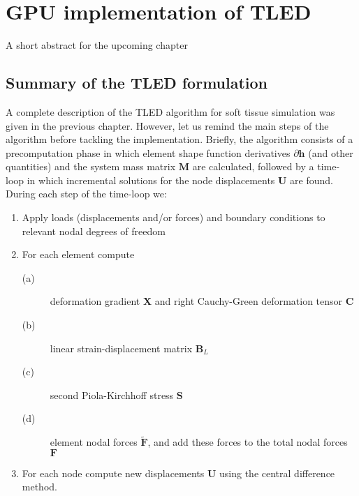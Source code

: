 \chapter{GPU implementation of TLED}
\label{chap6}
\begin{shortAbstract}
A short abstract for the upcoming chapter
\end{shortAbstract}

\section{Summary of the TLED formulation}
A complete description of the TLED algorithm for soft tissue simulation was given in the previous chapter. However, let us remind the main steps of the algorithm before tackling the implementation. Briefly, the algorithm consists of a precomputation phase in which element shape function derivatives $ \partial \mathbf{h} $ (and other quantities) and the system mass matrix $ \mathbf{M} $ are calculated, followed by a time-loop in which incremental solutions for the node displacements $ \mathbf{U} $ are found. During each step of the time-loop we:
\begin{enumerate}
\item Apply loads (displacements and/or forces) and boundary conditions to relevant nodal degrees of freedom
\item For each element compute
\begin{description}
\item[(a)] deformation gradient $ \mathbf{X} $ and right Cauchy-Green deformation tensor $ \mathbf{C} $
\item[(b)] linear strain-displacement matrix $ \mathbf{B}_L $
\item[(c)] second Piola-Kirchhoff stress $ \mathbf{S} $
\item[(d)] element nodal forces $ \mathbf{\tilde{F}} $, and add these forces to the total nodal forces $ \mathbf{F} $
\end{description}
\item For each node compute new displacements $ \mathbf{U} $ using the central difference method.
\end{enumerate}

\bigskip

